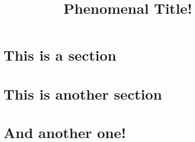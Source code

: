 \documentclass{fhnwfactsheet}
\title{Phenomenal Title!}
\begin{document}
\begin{factpage}

\begin{overview}
    \lipsum[2]
\end{overview}


\begin{content}

    \section{This is a section}
    \lipsum[2-3]
    \section{This is another section}
    \lipsum[4]
    \section{And another one!}
    \lipsum[5]

\end{content}

\end{factpage}
\end{document}
